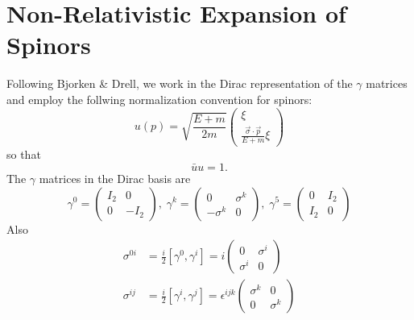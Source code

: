 \documentclass{book}[12pt]
\begin{document}
\chapter{Non-Relativistic Expansion of Spinors}
Following Bjorken \& Drell, we work in the Dirac representation of the $\gamma$ matrices and employ the follwing normalization convention for spinors:
\begin{equation}
u(p)=\sqrt{\frac{E+m}{2m}}\left(\begin{array}{c}
\xi\\
\frac{\vec{\sigma}\cdot\vec{p}}{E+m}\xi
\end{array}\right)
\end{equation}
so that
\begin{equation}
\bar{u}u=1.
\end{equation}
The $\gamma$ matrices in the Dirac basis are
\begin{equation}
\gamma^0=\left(\begin{array}{cc}
I_2 & 0 \\
0 & -I_2
\end{array}\right),\;\gamma^k=\left(\begin{array}{cc}
0 & \sigma^k\\
-\sigma^k & 0
\end{array}\right),\;\gamma^5=\left(\begin{array}{cc}
0 & I_2\\
I_2 & 0
\end{array}\right)
\end{equation}
Also
\begin{equation}
\begin{split}
\sigma^{0i}&=\frac{i}{2}\left[\gamma^0,\gamma^i\right]=i\left(\begin{array}{cc}
0 & \sigma^i\\
\sigma^i & 0
\end{array}\right)\\
\sigma^{ij}&=\frac{i}{2}\left[\gamma^i,\gamma^j\right]=\epsilon^{ijk}\left(\begin{array}{cc}
\sigma^k & 0\\
0 & \sigma^k
\end{array}\right)
\end{split}
\end{equation}
\end{document}
